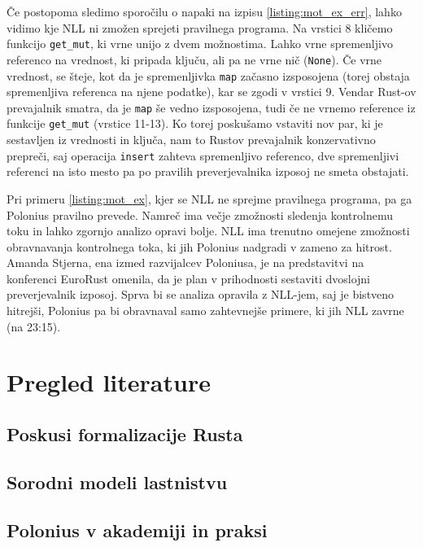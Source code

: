 \documentclass[a4paper,12pt,openright]{book}
\begin{document}
Če postopoma sledimo sporočilu o napaki na izpisu \ref{listing:mot_ex_err}, lahko vidimo kje NLL ni zmožen sprejeti pravilnega programa. Na vrstici 8 kličemo funkcijo \verb|get_mut|, ki vrne unijo z dvem možnostima. Lahko vrne spremenljivo referenco na vrednost, ki pripada ključu, ali pa ne vrne nič (\verb|None|). Če vrne vrednost, se šteje, kot da je spremenljivka \verb|map| začasno izsposojena (torej obstaja spremenljiva referenca na njene podatke), kar se zgodi v vrstici 9. Vendar Rust-ov prevajalnik smatra, da je \verb|map| še vedno izsposojena, tudi če ne vrnemo reference iz funkcije \verb|get_mut| (vrstice 11-13). Ko torej poskušamo vstaviti nov par, ki je sestavljen iz vrednosti in ključa, nam to Rustov prevajalnik konzervativno prepreči, saj operacija \verb|insert| zahteva spremenljivo referenco, dve spremenljivi referenci na isto mesto pa po pravilih preverjevalnika izposoj ne smeta obstajati.

Pri primeru \ref{listing:mot_ex}, kjer se NLL ne sprejme pravilnega programa, pa ga Polonius pravilno prevede. Namreč ima večje zmožnosti sledenja kontrolnemu toku in lahko zgornjo analizo opravi bolje. NLL ima trenutno omejene zmožnosti obravnavanja kontrolnega toka, ki jih Polonius nadgradi v zameno za hitrost. Amanda Stjerna, ena izmed razvijalcev Poloniusa, je na predstavitvi na konferenci EuroRust omenila, da je plan v prihodnosti sestaviti dvoslojni preverjevalnik izposoj. Sprva bi se analiza opravila z NLL-jem, saj je bistveno hitrejši, Polonius pa bi obravnaval samo zahtevnejše primere, ki jih NLL zavrne \cite{eurorustFirstSixYears2024} (na 23:15).

\chapter{Pregled literature}


\section{Poskusi formalizacije Rusta}

\section{Sorodni modeli lastnistvu}

\section{Polonius v akademiji in praksi}
\end{document}
